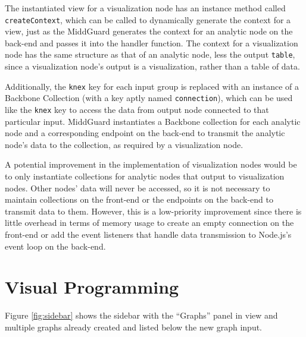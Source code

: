 \documentclass[midd]{thesis}
\begin{document}
The instantiated view for a visualization node has an instance method called
\texttt{createContext}, which can be called to dynamically generate the context
for a view, just as the MiddGuard generates the context for an analytic node on
the back-end and passes it into the handler function. The context for a
visualization node has the same structure as that of an analytic node, less the
output \texttt{table}, since a visualization node's output is a visualization,
rather than a table of data.

Additionally, the \texttt{knex} key for each input group is replaced with an
instance of a Backbone Collection (with a key aptly named \texttt{connection}),
which can be used like the \texttt{knex} key to access the data from output node
connected to that particular input. MiddGuard instantiates a Backbone collection
for each analytic node and a corresponding endpoint on the back-end to transmit
the analytic node's data to the collection, as required by a visualization node.

A potential improvement in the implementation of visualization nodes would be to
only instantiate collections for analytic nodes that output to visualization
nodes. Other nodes' data will never be accessed, so it is not necessary to
maintain collections on the front-end or the endpoints on the back-end to
transmit data to them. However, this is a low-priority improvement since there
is little overhead in terms of memory usage to create an empty connection on the
front-end or add the event listeners that handle data transmission to Node.js's
event loop on the back-end.

\section{Visual Programming}

Figure \ref{fig:sidebar} shows the sidebar with the ``Graphs'' panel in
view and multiple graphs already created and listed below the new graph input.
\end{document}
